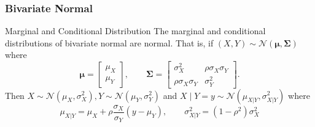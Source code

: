 \documentclass[serif,mathserif,professionalfont]{beamer}
\begin{document}
\begin{frame}
	
	\frametitle{Bivariate Normal}
	
	\begin{block}{Marginal and Conditional Distribution}
		The marginal and conditional distributions of bivariate normal are normal. That is, if $ \left(X, Y \right) \sim \mathcal{N} \left(\bm{\mu}, \bm{\Sigma} \right) $ where
		\begin{equation*}
		\bm{\mu} = 
		\begin{bmatrix}
		\mu_X \\
		\mu_Y
		\end{bmatrix}, \qquad
		\bm{\Sigma} = 
		\begin{bmatrix}
		\sigma_X^2 & \rho \sigma_X \sigma_Y \\
		\rho \sigma_X \sigma_Y & \sigma_Y^2
		\end{bmatrix}.
		\end{equation*}
		Then $ X \sim \mathcal{N}\left(\mu_X, \sigma_X^2 \right), Y \sim \mathcal{N}\left(\mu_Y, \sigma_Y^2 \right) $ and $ X \; | \; Y = y \sim \mathcal{N}\left(\mu_{X|Y},  \sigma_{X|Y}^2 \right) $ where
		\begin{equation*}
		\mu_{X|Y} = \mu_X + \rho \frac{\sigma_X}{\sigma_Y} \left(y - \mu_Y \right), \qquad \sigma_{X|Y}^2 = \left(1-\rho^2 \right) \sigma_X^2
		\end{equation*}
	\end{block}
	
	
\end{frame}


%	
%	
%	
\end{document}
